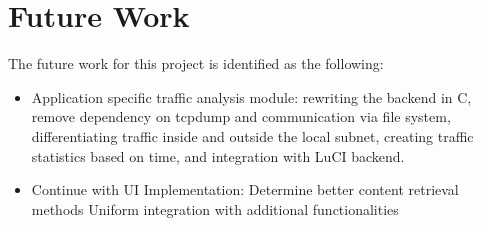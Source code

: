 \section{Future Work}

The future work for this project is identified as the following:

\begin{itemize}

\item Application specific traffic analysis module: rewriting the backend in C, remove dependency on tcpdump and communication via file system, differentiating traffic inside and outside the local subnet, creating traffic statistics based on time, and integration with LuCI backend.

\item Continue with UI Implementation:
Determine better content retrieval methods
Uniform integration with additional functionalities

\end{itemize}